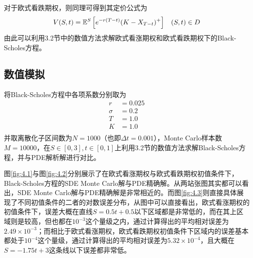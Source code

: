 \documentclass[UTF8，12pt]{ctexart}
\numberwithin{equation}{section}
\begin{document}
\noindent 对于欧式看跌期权，则同理可得到其定价公式为
\begin{equation}
	V(S,t)=\mathbb{E}^S\left[e^{-r(T-t)}(K-X_{T-t})^+\right]\hspace{0.3cm}(S,t)\in D
\end{equation}
由此可以利用3.2节中的数值方法求解欧式看涨期权和欧式看跌期权下的Black-Scholes方程。

\subsection{数值模拟}

将Black-Scholes方程中各项系数分别取为
\begin{equation}
	\begin{split}
		r&=0.025\\
		\sigma&=0.2\\
		T&=1.0\\
		K&=1.0\\
	\end{split}
\end{equation}
并取离散化子区间数为$N=1000$（也即$\Delta t=0.001$），Monte Carlo样本数$M=10000$，在$S\in[0,3],t\in[0,1]$上利用3.2节的数值方法求解Black-Scholes方程，并与PDE解析解进行对比。

图\ref{fig:4.1}与图\ref{fig:4.2}分别展示了在欧式看涨期权与欧式看跌期权初值条件下，Black-Scholes方程的SDE Monte Carlo解与PDE精确解。从两站张图其实都可以看出，SDE Monte Carlo解与PDE精确解是非常相近的。而图\ref{fig:4.3}则直接具体展现了不同初值条件的二者的对数误差分布，从图中可以直接看出，欧式看涨期权的初值条件下，误差大概在直线$S=0.5t+0.5$以下区域都是非常低的，而在其上区域则是较高，但也都在$10^{-3}$这个量级之内，通过计算得出的平均相对误差为$2.49\times 10^{-3}$；而相比于欧式看涨期权，欧式看跌期权初值条件下区域内的误差基本都处于$10^{-4}$这个量级，通过计算得出的平均相对误差为$5.32\times 10^{-4}$，且大概在$S=-1.75t+3$这条线以下误差都非常低。
\end{document}
